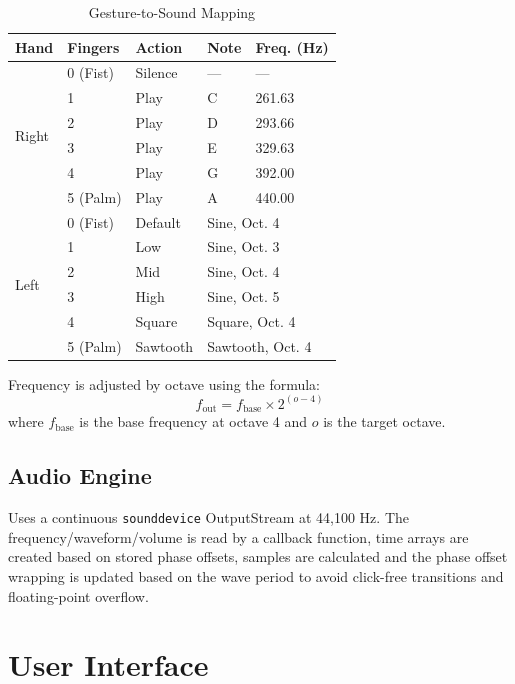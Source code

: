 \documentclass[conference]{IEEEtran}
\begin{document}
\begin{table}[htbp]
\caption{Gesture-to-Sound Mapping}
\label{tab:gesture_mapping}
\centering
\begin{tabular}{p{0.8cm}p{1.5cm}p{1.2cm}p{1cm}p{1.5cm}}
\toprule
\textbf{Hand} & \textbf{Fingers} & \textbf{Action} & \textbf{Note} & \textbf{Freq. (Hz)} \\
\midrule
\multirow{6}{*}{Right} & 0 (Fist) & Silence & --- & --- \\
 & 1 & Play & C & 261.63 \\
 & 2 & Play & D & 293.66 \\
 & 3 & Play & E & 329.63 \\
 & 4 & Play & G & 392.00 \\
 & 5 (Palm) & Play & A & 440.00 \\
\midrule
\multirow{6}{*}{Left} & 0 (Fist) & Default & \multicolumn{2}{l}{Sine, Oct. 4} \\
 & 1 & Low & \multicolumn{2}{l}{Sine, Oct. 3} \\
 & 2 & Mid & \multicolumn{2}{l}{Sine, Oct. 4} \\
 & 3 & High & \multicolumn{2}{l}{Sine, Oct. 5} \\
 & 4 & Square & \multicolumn{2}{l}{Square, Oct. 4} \\
 & 5 (Palm) & Sawtooth & \multicolumn{2}{l}{Sawtooth, Oct. 4} \\
\bottomrule
\end{tabular}
\end{table}

Frequency is adjusted by octave using the formula:
\begin{equation}
f_{\text{out}} = f_{\text{base}} \times 2^{(o - 4)}
\label{eq:octave}
\end{equation}
where $f_{\text{base}}$ is the base frequency at octave 4 and $o$ is the target octave.

\subsection{Audio Engine}

Uses a continuous \texttt{sounddevice} OutputStream at 44,100 Hz. The frequency/waveform/volume is read by a callback function, time arrays are created based on stored phase offsets, samples are calculated and the phase offset wrapping is updated based on the wave period to avoid click-free transitions and floating-point overflow.

\section{User Interface}
\end{document}
